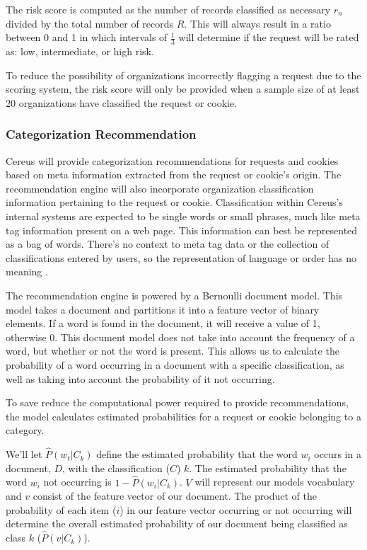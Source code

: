 The risk score is computed as the number of records classified as necessary \( r_n \) divided by the total number of records \( R \). This will always result in a ratio between 0 and 1 in which intervals of \(\frac{1}{3}\) will determine if the request will be rated as: low, intermediate, or high risk.

To reduce the possibility of organizations incorrectly flagging a request due to the scoring system, the risk score will only be provided when a sample size of at least 20 organizations have classified the request or cookie.

\subsubsection*{Categorization Recommendation}

Cereus will provide categorization recommendations for requests and cookies based on meta information extracted from the request or cookie's origin. The recommendation engine will also incorporate organization classification information pertaining to the request or cookie. Classification within Cereus's internal systems are expected to be single words or small phrases, much like meta tag information present on a web page. This information can best be represented as a bag of words. There's no context to meta tag data or the collection of classifications entered by users, so the representation of language or order has no meaning \cite{manning.2008}.

The recommendation engine is powered by a Bernoulli document model. This model takes a document and partitions it into a feature vector of binary elements. If a word is found in the document, it will receive a value of 1, otherwise 0. This document model does not take into account the frequency of a word, but whether or not the word is present. This allows us to calculate the probability of a word occurring in a document with a specific classification, as well as taking into account the probability of it not occurring.

To save reduce the computational power required to provide recommendations, the model calculates estimated probabilities for a request or cookie belonging to a category.

We'll let \(\hat{P}(w_{t}|C_{k})\) define the estimated probability that the word \(w_{i}\) occurs in a document, \(D\), with the classification (\(C\)) \(k\). The estimated probability that the word \(w_{i}\) not occurring is \(1 - \hat{P}(w_{i}|C_{k})\). \(V\) will represent our models vocabulary and \(v\) consist of the feature vector of our document. The product of the probability of each item (\(i\)) in our feature vector occurring or not occurring will determine the overall estimated probability of our document being classified as class \(k\) (\(\hat{P}(v|C_{k})\)).

